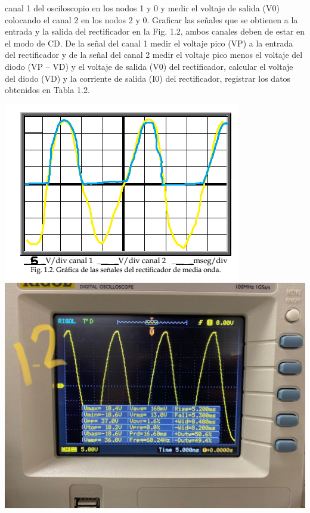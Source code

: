 \documentclass[12pt]{article}
\begin{document}
\begin{enumerate}
\begin{enumerate}
                canal 1 del osciloscopio en los nodos 1 y 0 y medir el voltaje de salida (V0) colocando el
                canal 2 en los nodos 2 y 0. Graficar las señales que se obtienen a la entrada y la salida del
                rectificador en la Fig. 1.2, ambos canales deben de estar en el modo de CD. De la señal del
                canal 1 medir el voltaje pico (VP) a la entrada del rectificador y de la señal del canal 2 medir
                el voltaje pico menos el voltaje del diodo (VP – VD) y el voltaje de salida (V0) del rectificador,
                calcular el voltaje del diodo (VD) y la corriente de salida (I0) del rectificador, registrar los
                datos obtenidos en Tabla 1.2.
                \begin{center}
                    \includegraphics*[scale=0.75]{fig1-2.png}
                    \includegraphics*[scale=0.2]{img1-21.jpg}

\end{center}
\end{enumerate}
\end{enumerate}
\end{document}
